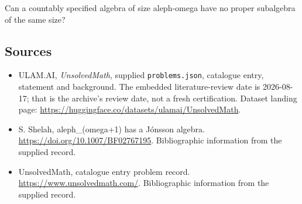 \documentclass[11pt,a4paper]{article}
\begin{document}
Can a countably specified algebra of size aleph-omega have no proper subalgebra of the same size?

\subsection{Sources}

{\small

\begin{itemize}

\item[\hypertarget{source:statement:1}{S1}] ULAM.AI, \emph{UnsolvedMath}, supplied \texttt{problems.json}, catalogue entry, statement and background. The embedded literature-review date is 2026-08-17; that is the archive’s review date, not a fresh certification. Dataset landing page: \url{https://huggingface.co/datasets/ulamai/UnsolvedMath}.

\item[\hypertarget{source:statement:2}{S2}] S. Shelah, aleph\_(omega+1) has a Jónsson algebra. \url{https://doi.org/10.1007/BF02767195}. Bibliographic information from the supplied record.

\item[\hypertarget{source:statement:3}{S3}] UnsolvedMath, catalogue entry problem record. \url{https://www.unsolvedmath.com/}. Bibliographic information from the supplied record.

\end{itemize}

}

\label{end:statement}
\end{document}
